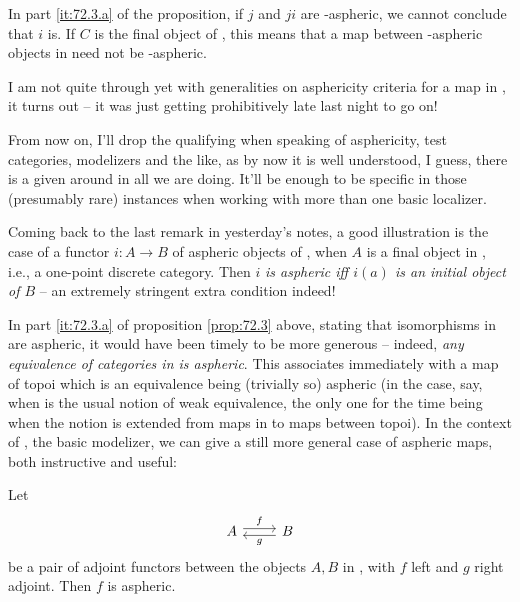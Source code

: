 \begin{remarknum}
  In part \ref{it:72.3.a} of the proposition, if $j$ and $ji$ are
  \scrW-aspheric, we cannot conclude that $i$ is. If $C$ is the final
  object of \Cat, this means that a map between \scrW-aspheric objects
  in \Cat{} need not be \scrW-aspheric.
\end{remarknum}

\bigbreak

\presectionfill{}\par

%
\label{sec:73}%
I am not quite through yet with generalities on asphericity criteria
for a map in \Cat, it turns out -- it was just getting prohibitively
late last night to go on!

From now on, I'll drop the qualifying \scrW{} when speaking of
asphericity, test categories, modelizers and the like, as by now it is
well understood, I guess, there is a given \scrW{} around in all we
are doing. It'll be enough to be specific in those (presumably rare)
instances when working with more than one basic localizer.

Coming back to the last remark in yesterday's notes, a good
illustration is the case of a functor $i:A\to B$ of aspheric objects
of \Cat, when $A$ is a final object in \Cat, i.e., a one-point
discrete category. Then $i$ \emph{is aspheric if{f} $i(a)$ is an
  initial object of $B$} -- an extremely stringent extra condition
indeed!

In part \ref{it:72.3.a} of proposition \ref{prop:72.3} above, stating
that isomorphisms in \Cat{} are aspheric, it would have been timely to
be more generous -- indeed, \emph{any equivalence of categories in
  \Cat{} is aspheric}. This associates immediately with a map of topoi
which is an equivalence being (trivially so) aspheric (in the case,
say, when \scrW{} is the usual notion of weak equivalence, the only
one for the time being when the notion is extended from maps in \Cat{}
to maps between topoi). In the context of \Cat, the basic modelizer,
we can give a still more general case of aspheric maps, both
instructive and useful:
\addtocounter{propositionnum}{3}
\begin{propositionnum}\label{prop:73.4}
  Let
  \[\begin{tikzcd}
    A \ar[r,shift left,"f"] & B \ar[l,shift left,"g"]
  \end{tikzcd}\]
  be a pair of adjoint functors between the objects $A,B$ in \Cat,
  with $f$ left and $g$ right adjoint. Then $f$ is aspheric.
\end{propositionnum}


